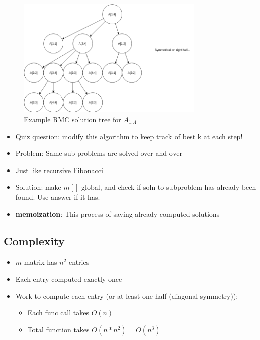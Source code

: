 \documentclass[12pt, letter]{article}
\begin{document}
\begin{figure}[h]
    \centering
    \includegraphics[width=0.8\textwidth]{rmc}
    \caption{Example RMC solution tree for $A_{1..4}$}
    \label{fig:rmc}
\end{figure}
\begin{itemize}
    \item Quiz question: modify this algorithm to keep track of best k at each step!
    \item Problem: Same sub-problems are solved over-and-over
    \item Just like recursive Fibonacci
    \item Solution: make $m[]$ global, and check if soln to subproblem has already been found. Use answer if it has.
    \item \textbf{memoization}: This process of saving already-computed solutions
\end{itemize}

\subsection*{Complexity}
\begin{itemize}
    \item $m$ matrix has $n^2$ entries
    \item Each entry computed exactly once
    \item Work to compute each entry (or at least one half (diagonal symmetry)):
    \begin{itemize}
        \item Each func call takes $O(n)$
        \item Total function takes $O(n*n^2) = O(n^{3})$
    \end{itemize}
\end{itemize}
\end{document}

